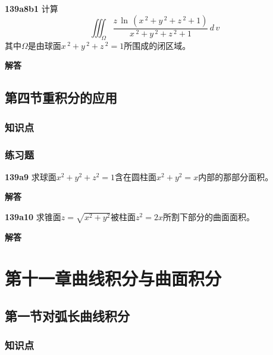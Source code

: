 \documentclass[a4paper,10pt]{article} %
\begin{document}

\textheight


\par\noindent \textbf{139a8b1} \quad 计算
$$ \iiint_{\Omega} \frac{z\,\ln \,(x\,^2+y\,^2+z\,^2+1)}{x\,^2+y\,^2+z\,^2+1}\,d\,v$$
其中$\Omega$是由球面$x\,^2+y\,^2+z\,^2=1$所围成的闭区域。
\par\noindent \textbf{ 解答}




\newpage
\subsection{第四节\quad 重积分的应用}
\subsubsection{知识点}
\subsubsection{练习题}

\par\noindent \textbf{139a9} \quad 求球面$x^2+y^2+z^2=1$含在圆柱面$x^2+y^2=x$内部的那部分面积。
\par\noindent \textbf{ 解答}

\textheight

\par\noindent \textbf{139a10} \quad 求锥面$z=\sqrt{x^2+y^2}$被柱面$z^2=2x$所割下部分的曲面面积。
\par\noindent \textbf{ 解答}

\textheight

\newpage
\section{第十一章\quad 曲线积分与曲面积分}
\subsection{第一节\quad 对弧长曲线积分}
\subsubsection{知识点}
\end{document}
